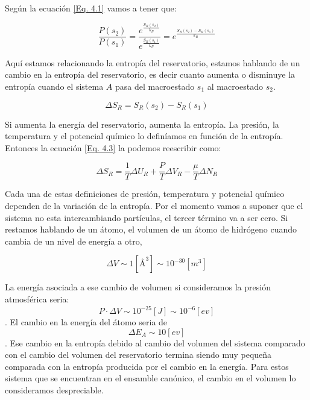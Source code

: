 \documentclass[11pt,fleqn]{book}
\begin{document}
Según la ecuación \ref{Eq. 4.1} vamos a tener que:

\begin{equation}
    \frac{P(s_{2})}{P(s_{1})}=\frac{e^{\frac{S_{R}(s_{2})}{k_{B}}}}{e^{\frac{S_{R}(s_{1})}{k_{B}}}}=e^{\frac{S_{R}(s_{2})-S_{R}(s_{1})}{k_{B}}}
    \label{Eq. 4.2}
\end{equation}

Aquí estamos relacionando la entropía del reservatorio, estamos hablando de un cambio en la entropía del reservatorio, es decir cuanto aumenta o disminuye la entropía cuando el sistema $A$ pasa del macroestado $s_{1}$ al macroestado $s_{2}$.

\begin{equation}
    \Delta S_{R}=S_{R}(s_{2})-S_{R}(s_{1})
    \label{Eq. 4.3}
\end{equation}

Si aumenta la energía del reservatorio, aumenta la entropía. La presión, la temperatura y el potencial químico lo definíamos en función de la entropía. Entonces la ecuación \ref{Eq. 4.3} la podemos reescribir como:

\begin{equation}
     \Delta S_{R}=\frac{1}{T}\Delta U_{R}+\frac{P}{T}\Delta V_{R}-\frac{\mu}{T}\Delta N_{R}
     \label{Eq. 4.4}
\end{equation}

Cada una de estas definiciones de presión, temperatura y potencial químico dependen de la variación de la entropía. Por el momento vamos a suponer que el sistema no esta intercambiando partículas, el tercer término va a ser cero. Si restamos hablando de un átomo, el volumen de un átomo de hidrógeno cuando cambia de un nivel de energía a otro, 


\begin{equation*}
 \Delta V\sim 1[\si{\angstrom}^{3}]\sim10^{-30}[m^{3}]  
\end{equation*}

La energía asociada a ese cambio de volumen si consideramos la presión atmosférica seria: $$P\cdot\Delta V\sim10^{-25}[J]\sim10^{-6}[ev]$$. El cambio en la energía del átomo seria de $$\Delta E_{A}\sim10[ev]$$. Ese cambio en la entropía debido al cambio del volumen del sistema comparado con el cambio del volumen del reservatorio termina siendo muy pequeña comparada con la entropía producida por el cambio en la energía. Para estos sistema que se encuentran en el ensamble canónico, el cambio en el volumen lo consideramos despreciable. 
\end{document}
